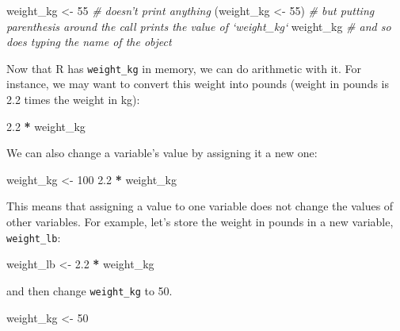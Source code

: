 \documentclass[]{book}
\newenvironment{Shaded}{\begin{snugshade}}{\end{snugshade}}
\newcommand{\DecValTok}[1]{\textcolor[rgb]{0.00,0.00,0.81}{#1}}
\newcommand{\FloatTok}[1]{\textcolor[rgb]{0.00,0.00,0.81}{#1}}
\newcommand{\StringTok}[1]{\textcolor[rgb]{0.31,0.60,0.02}{#1}}
\newcommand{\CommentTok}[1]{\textcolor[rgb]{0.56,0.35,0.01}{\textit{#1}}}
\newcommand{\OperatorTok}[1]{\textcolor[rgb]{0.81,0.36,0.00}{\textbf{#1}}}
\newcommand{\NormalTok}[1]{#1}
\begin{document}
\begin{Shaded}
\begin{Highlighting}[]
\NormalTok{weight_kg <-}\StringTok{ }\DecValTok{55}    \CommentTok{# doesn't print anything}
\NormalTok{(weight_kg <-}\StringTok{ }\DecValTok{55}\NormalTok{)  }\CommentTok{# but putting parenthesis around the call prints the value of `weight_kg`}
\NormalTok{weight_kg          }\CommentTok{# and so does typing the name of the object}
\end{Highlighting}
\end{Shaded}

Now that R has \texttt{weight\_kg} in memory, we can do arithmetic with
it. For instance, we may want to convert this weight into pounds (weight
in pounds is 2.2 times the weight in kg):

\begin{Shaded}
\begin{Highlighting}[]
\FloatTok{2.2} \OperatorTok{*}\StringTok{ }\NormalTok{weight_kg}
\end{Highlighting}
\end{Shaded}

We can also change a variable's value by assigning it a new one:

\begin{Shaded}
\begin{Highlighting}[]
\NormalTok{weight_kg <-}\StringTok{ }\DecValTok{100}
\FloatTok{2.2} \OperatorTok{*}\StringTok{ }\NormalTok{weight_kg}
\end{Highlighting}
\end{Shaded}

This means that assigning a value to one variable does not change the
values of other variables. For example, let's store the weight in pounds
in a new variable, \texttt{weight\_lb}:

\begin{Shaded}
\begin{Highlighting}[]
\NormalTok{weight_lb <-}\StringTok{ }\FloatTok{2.2} \OperatorTok{*}\StringTok{ }\NormalTok{weight_kg}
\end{Highlighting}
\end{Shaded}

and then change \texttt{weight\_kg} to 50.

\begin{Shaded}
\begin{Highlighting}[]
\NormalTok{weight_kg <-}\StringTok{ }\DecValTok{50}
\end{Highlighting}
\end{Shaded}
\end{document}
